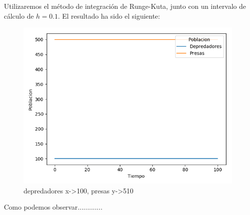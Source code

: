 \documentclass[11pt,a4paper]{article}
\begin{document}
Utilizaremos el método de integración de Runge-Kuta, junto con un intervalo de cálculo de $h=0.1$. El resultado ha sido el siguiente:
\begin{figure}[H]
\centering
\includegraphics[scale=0.65]{img/2-100-500.png}
\caption{depredadores x->100,   presas y->510}
\end{figure}

Como podemos observar.............
\end{document}
